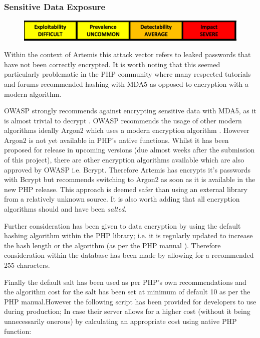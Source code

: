    
    
    
    

    \subsubsection{Sensitive Data Exposure}

    \begin{figure}[h]
    	\centering
    	\includegraphics[scale=0.5,center]{chapters/chapter03/figures/sensitive.png}
    	\label{Sensitive Data Exposure}
    \end{figure}
    
    Within the context of Artemis this attack vector refers to leaked passwords that have not been correctly encrypted. It is worth noting that this seemed particularly problematic in the PHP community where many respected tutorials and forums recommended hashing with MDA5  as opposed to encryption with a modern algorithm.
    
    OWASP strongly recommends against encrypting sensitive data with MDA5, as it is almost trivial to decrypt \cite{OWASPc}. OWASP recommends the usage of other modern algorithms ideally Argon2 which uses a modern encryption algorithm \cite{OWASPc}. However Argon2 is not yet available in PHP's native functions. Whilst it has been proposed for release in upcoming versions (due almost weeks after the submission of this project), there are other encryption algorithms available which are also approved by OWASP i.e. Bcrypt. Therefore Artemis has encrypts it's passwords with Bcrypt but recommends switching to Argon2 as soon as it is available in the new PHP release. This approach is deemed safer than using an external library from a relatively unknown source. It is also worth adding that all encryption algorithms should and have been \textit{salted}.
    
    Further consideration has been given to data encryption by using the default hashing algorithm within the PHP library; i.e. it is regularly updated to increase the hash length or the algorithm (as per the PHP manual \cite{PHPc}). Therefore consideration within the database has been made by allowing for a recommended 255 characters.
    
    Finally the default salt has been used as per PHP's own recommendations and the algorithm cost for the salt has been set at minimum of default 10 as per the PHP manual.However the following script has been provided for developers to use during production; In case their server allows for a higher cost (without it being unnecessarily onerous) by calculating an appropriate cost using native PHP function:


